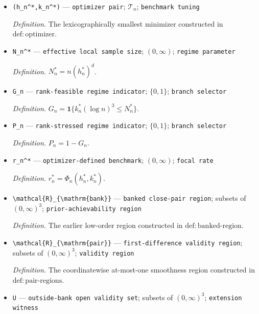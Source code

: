 \documentclass{article}
\begin{document}
\begin{itemize}
  \item \texttt{(h\_\allowbreak{}n\textasciicircum{}*,\allowbreak{}k\_\allowbreak{}n\textasciicircum{}*)} --- \texttt{optimizer pair}; \(\mathcal{T}_n\); \texttt{benchmark tuning}
  \par\smallskip\noindent\emph{Definition.} The lexicographically smallest minimizer constructed in \(\mathrm{def:optimizer}\).
  \item \texttt{N\_\allowbreak{}n\textasciicircum{}*} --- \texttt{effective local sample size}; \((0,\infty)\); \texttt{regime parameter}
  \par\smallskip\noindent\emph{Definition.} \(N_n^*=n(h_n^*)^d\).
  \item \texttt{G\_\allowbreak{}n} --- \texttt{rank-\allowbreak{}feasible regime indicator}; \(\{0,1\}\); \texttt{branch selector}
  \par\smallskip\noindent\emph{Definition.} \(G_n=\mathbf{1}\{k_n^*(\log n)^3\leq N_n^*\}\).
  \item \texttt{P\_\allowbreak{}n} --- \texttt{rank-\allowbreak{}stressed regime indicator}; \(\{0,1\}\); \texttt{branch selector}
  \par\smallskip\noindent\emph{Definition.} \(P_n=1-G_n\).
  \item \texttt{r\_\allowbreak{}n\textasciicircum{}*} --- \texttt{optimizer-\allowbreak{}defined benchmark}; \((0,\infty)\); \texttt{focal rate}
  \par\smallskip\noindent\emph{Definition.} \(r_n^*=\Phi_n(h_n^*,k_n^*)\).
  \item \texttt{\textbackslash{}\allowbreak{}mathcal\{R\}\allowbreak{}\_\allowbreak{}\{\textbackslash{}\allowbreak{}mathrm\{bank\}\allowbreak{}\}\allowbreak{}} --- \texttt{banked close-\allowbreak{}pair region}; subsets of \((0,\infty)^3\); \texttt{prior-\allowbreak{}achievability region}
  \par\smallskip\noindent\emph{Definition.} The earlier low-order region constructed in \(\mathrm{def:banked\mbox{-}region}\).
  \item \texttt{\textbackslash{}\allowbreak{}mathcal\{R\}\allowbreak{}\_\allowbreak{}\{\textbackslash{}\allowbreak{}mathrm\{pair\}\allowbreak{}\}\allowbreak{}} --- \texttt{first-\allowbreak{}difference validity region}; subsets of \((0,\infty)^3\); \texttt{validity region}
  \par\smallskip\noindent\emph{Definition.} The coordinatewise at-most-one smoothness region constructed in \(\mathrm{def:pair\mbox{-}regions}\).
  \item \texttt{U} --- \texttt{outside-\allowbreak{}bank open validity set}; subsets of \((0,\infty)^3\); \texttt{extension witness}

\end{itemize}
\end{document}
